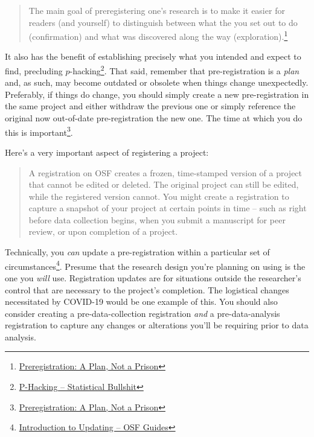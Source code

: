 \documentclass[]{tufte-book}
\begin{document}
\begin{quote}
The main goal of preregistering one's research is to make it easier for readers (and yourself) to distinguish between what the you set out to do (confirmation) and what was discovered along the way (exploration).\footnote{\href{https://www.cos.io/blog/preregistration-plan-not-prison}{Preregistration: A Plan, Not a Prison}}
\end{quote}

It also has the benefit of establishing precisely what you intended and expect to find, precluding \(p\)-hacking\footnote{\href{https://statisticalbullshit.com/2017/07/17/p-hacking/}{P-Hacking -- Statistical Bullshit}}. That said, remember that pre-registration is a \emph{plan} and, as such, may become outdated or obsolete when things change unexpectedly. Preferably, if things do change, you should simply create a new pre-registration in the same project and either withdraw the previous one or simply reference the original now out-of-date pre-registration the new one. The time at which you do this is important\footnote{\href{https://www.cos.io/blog/preregistration-plan-not-prison}{Preregistration: A Plan, Not a Prison}}.

Here's a very important aspect of registering a project:

\begin{quote}
A registration on OSF creates a frozen, time-stamped version of a project that cannot be edited or deleted. The original project can still be edited, while the registered version cannot. You might create a registration to capture a snapshot of your project at certain points in time -- such as right before data collection begins, when you submit a manuscript for peer review, or upon completion of a project.
\end{quote}

Technically, you \emph{can} update a pre-registration within a particular set of circumstances\footnote{\href{https://help.osf.io/hc/en-us/articles/4414482864663-Introduction-to-Updating-}{Introduction to Updating -- OSF Guides}}. Presume that the research design you're planning on using is the one you \emph{will} use. Registration updates are for situations outside the researcher's control that are necessary to the project's completion. The logistical changes necessitated by COVID-19 would be one example of this. You should also consider creating a pre-data-collection registration \emph{and} a pre-data-analysis registration to capture any changes or alterations you'll be requiring prior to data analysis.
\end{document}
